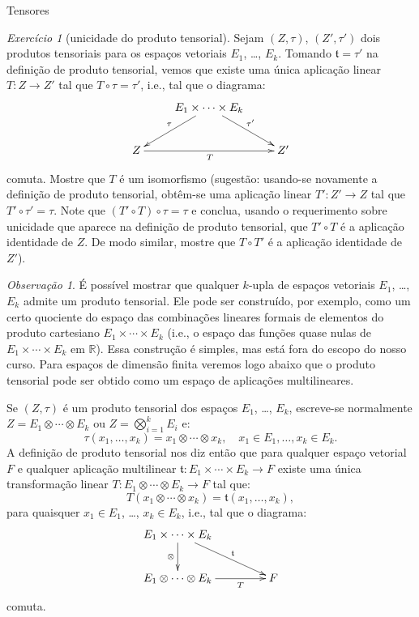 \documentclass[oneside,11pt]{amsart}
\newcommand{\R}{\mathds R}
\theoremstyle{remark}\newtheorem{exercise}{Exercício}[section]
\theoremstyle{plain}\newtheorem{teo}{Teorema}[section]
\theoremstyle{plain}\newtheorem{lem}[teo]{Lema}
\theoremstyle{plain}\newtheorem{prop}[teo]{Proposição}
\theoremstyle{definition}\newtheorem{defin}[teo]{Definição}
\theoremstyle{remark}\newtheorem{rem}[teo]{Observação}
\theoremstyle{definition}\newtheorem{example}[teo]{Exemplo}
\numberwithin{equation}{section}
\begin{document}
\begin{section}{Tensores}
\begin{exercise}[unicidade do produto tensorial]\label{exe:uniquetensorprod}
Sejam $(Z,\tau)$, $(Z',\tau')$ dois produtos tensoriais para os espaços vetoriais $E_1$, \dots, $E_k$. Tomando $\mathfrak t=\tau'$ na definição de produto
tensorial, vemos que existe uma única aplicação linear $T:Z\to Z'$ tal que $T\circ\tau=\tau'$, i.e., tal que o diagrama:
\[\xymatrix{%
&E_1\times\cdots\times E_k\ar[dl]_\tau\ar[dr]^{\tau'}\\
Z\ar[rr]_T&&Z'}\]
comuta. Mostre que $T$ é um isomorfismo (sugestão: usando-se novamente a definição de produto tensorial, obtêm-se uma aplicação linear $T':Z'\to Z$ tal que
$T'\circ\tau'=\tau$. Note que $(T'\circ T)\circ\tau=\tau$ e conclua, usando o requerimento sobre unicidade que aparece na definição de produto tensorial,
que $T'\circ T$ é a aplicação identidade de $Z$. De modo similar, mostre que $T\circ T'$ é a aplicação identidade de $Z'$).
\end{exercise}

\begin{rem}
É possível mostrar que qualquer $k$-upla de espaços vetoriais $E_1$, \dots, $E_k$ admite um produto tensorial. Ele pode ser construído, por exemplo,
como um certo quociente do espaço das combinações lineares formais de elementos do produto cartesiano $E_1\times\cdots\times E_k$ (i.e., o espaço
das funções quase nulas de $E_1\times\cdots\times E_k$ em $\R$). Essa construção é simples, mas está fora do escopo do nosso curso. Para espaços de dimensão
finita veremos logo abaixo que o produto tensorial pode ser obtido como um espaço de aplicações multilineares.
\end{rem}

Se $(Z,\tau)$ é um produto tensorial dos espaços $E_1$, \dots, $E_k$, escreve-se normalmente $Z=E_1\otimes\cdots\otimes E_k$ ou $Z=\bigotimes_{i=1}^kE_i$ e:
\[\tau(x_1,\ldots,x_k)=x_1\otimes\cdots\otimes x_k,\quad x_1\in E_1,\ldots,x_k\in E_k.\]
A definição de produto tensorial nos diz então que para qualquer espaço vetorial $F$ e qualquer aplicação multilinear $\mathfrak t:E_1\times\cdots\times E_k\to F$
existe uma única transformação linear $T:E_1\otimes\cdots\otimes E_k\to F$ tal que:
\[T(x_1\otimes\cdots\otimes x_k)=\mathfrak t(x_1,\ldots,x_k),\]
para quaisquer $x_1\in E_1$, \dots, $x_k\in E_k$, i.e., tal que o diagrama:
\[\xymatrix@C+20pt{%
E_1\times\cdots\times E_k\ar[d]_\otimes\ar[dr]^-{\mathfrak t}\\
E_1\otimes\cdots\otimes E_k\ar[r]_-T&F}\]
comuta.


\end{section}
\end{document}
